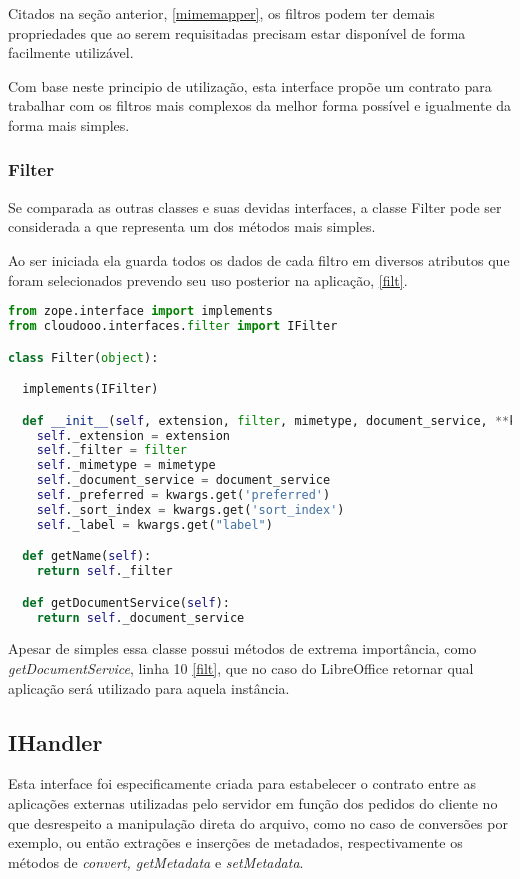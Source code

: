Citados na seção anterior, \ref{mimemapper}, os filtros podem ter demais propriedades que ao serem requisitadas precisam estar disponível de forma facilmente utilizável.

Com base neste principio de utilização, esta interface propõe um contrato para trabalhar com os filtros mais complexos da melhor forma possível e igualmente da forma mais simples.


\subsubsection{Filter}

Se comparada as outras classes e suas devidas interfaces, a classe Filter pode ser considerada a que representa um dos métodos mais simples.

Ao ser iniciada ela guarda todos os dados de cada filtro em diversos atributos que foram selecionados prevendo seu uso posterior na aplicação, \ref{filt}.

{\singlespace
\begin{lstlisting}[caption=Trecho de criação da classe File e método getDocumentService,language=python,label={filt}]
from zope.interface import implements
from cloudooo.interfaces.filter import IFilter

class Filter(object):

  implements(IFilter)

  def __init__(self, extension, filter, mimetype, document_service, **kwargs):
    self._extension = extension
    self._filter = filter
    self._mimetype = mimetype
    self._document_service = document_service
    self._preferred = kwargs.get('preferred')
    self._sort_index = kwargs.get('sort_index')
    self._label = kwargs.get("label")

  def getName(self):
    return self._filter

  def getDocumentService(self):
    return self._document_service
\end{lstlisting}
}

Apesar de simples essa classe possui métodos de extrema importância, como \textit{getDocumentService}, linha 10 \ref{filt}, que no caso do LibreOffice retornar qual aplicação será utilizado para aquela instância.

\subsection{IHandler}
\label{ihandler}

Esta interface foi especificamente criada para estabelecer o contrato entre as aplicações externas utilizadas pelo servidor em função dos pedidos do cliente no que desrespeito a manipulação direta do arquivo, como no caso de conversões por exemplo, ou então extrações e inserções de metadados, respectivamente os métodos de \textit{convert, getMetadata} e \textit{setMetadata}.

